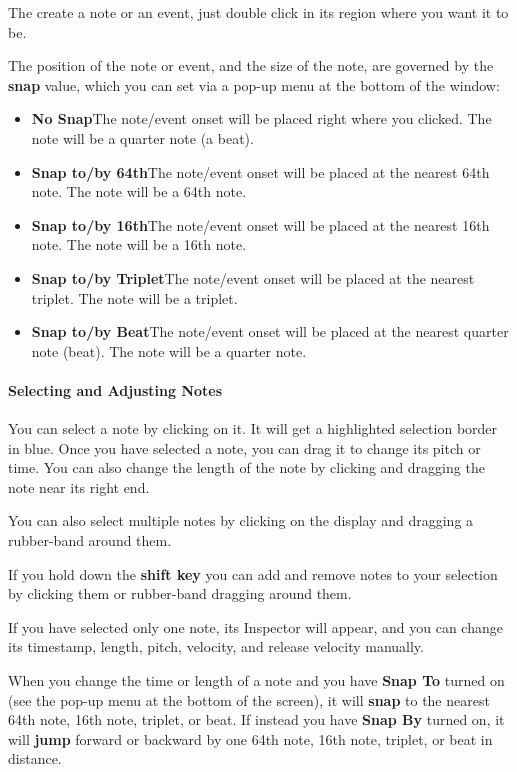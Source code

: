 \documentclass[twoside,10pt]{article}
\begin{document}
The create a note or an event, just double click in its region where you want it to be.

The position of the note or event, and the size of the note, are governed by the {\bf snap} value, which you can set via a pop-up menu at the bottom of the window:

\begin{itemize}
\item {\bf No Snap}\qquad The note/event onset will be placed right where you clicked.  The note will be a quarter note (a beat).
\item {\bf Snap to/by 64th}\qquad The note/event onset will be placed at the nearest 64th note.  The note will be a 64th note.
\item {\bf Snap to/by 16th}\qquad The note/event onset will be placed at the nearest 16th note.  The note will be a 16th note.
\item {\bf Snap to/by Triplet}\qquad The note/event onset will be placed at the nearest triplet.  The note will be a triplet.
\item {\bf Snap to/by Beat}\qquad The note/event onset will be placed at the nearest quarter note (beat).  The note will be a quarter note.
\end{itemize}

\paragraph{Selecting and Adjusting Notes}

You can select a note by clicking on it.  It will get a highlighted selection border in blue.  Once you have selected a note, you can drag it to change its pitch or time.  You can also change the length of the note by clicking and dragging the note near its right end.

You can also select multiple notes by clicking on the display and dragging a rubber-band around them.  

If you hold down the {\bf shift key} you can add and remove notes to your selection by clicking them or rubber-band dragging around them.

If you have selected only one note, its Inspector will appear, and you can change its timestamp, length, pitch, velocity, and release velocity manually.

When you change the time or length of a note and you have {\bf Snap To} turned on (see the pop-up menu at the bottom of the screen), it will {\bf snap} to the nearest 64th note, 16th note, triplet, or beat.  If instead you have {\bf Snap By} turned on, it will {\bf jump} forward or backward by one 64th note, 16th note, triplet, or beat in distance.
\end{document}
